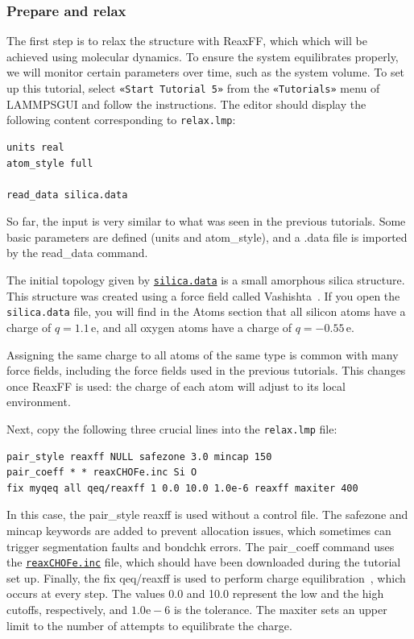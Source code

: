 \documentclass[9pt,tutorial]{livecoms}
\newcommand{\lmpcmd}[1]{\hspace{0pt}\colorbox{listing}{\textcolor{command}{\small{#1}}}\hspace{0pt}} %
\newcommand{\flecmd}[1]{\textcolor{command}{\texttt{#1}}} %
\newcommand{\guicmd}[1]{\textcolor{command}{\texttt{«#1»}}} %
\newcommand{\dwlcmd}[1]{\textcolor{download}{\texttt{#1}}} %
\newcommand{\lammpsgui}{\textsf{LAMMPS\textendash GUI}}
\newcommand{\filepath}{https://raw.githubusercontent.com/lammpstutorials/lammpstutorials-article/main/files/}
\begin{document}
\subsubsection{Prepare and relax}

The first step is to relax the structure with ReaxFF, which which will be achieved using
molecular dynamics.  To ensure the system equilibrates properly, we will monitor certain
parameters over time, such as the system volume.  To set up this
tutorial, select \guicmd{Start Tutorial 5} from the
\guicmd{Tutorials} menu of \lammpsgui{} and follow the instructions.
The editor should display the following content corresponding to \flecmd{relax.lmp}:
\begin{lstlisting}
units real
atom_style full

read_data silica.data

\end{lstlisting}
So far, the input is very similar to what was seen in the previous tutorials.
Some basic parameters are defined (\lmpcmd{units} and \lmpcmd{atom\_style}),
and a \lmpcmd{.data} file is imported by the \lmpcmd{read\_data} command.

The initial topology given by \href{\filepath tutorial5/silica.data}{\dwlcmd{silica.data}}
is a small amorphous silica structure.  This structure was created using a force field called
Vashishta~\cite{vashishta1990interaction}.  If you open the \flecmd{silica.data}
file, you will find in the \lmpcmd{Atoms} section that all silicon atoms have a
charge of $q = 1.1\,\text{e}$, and all oxygen atoms have a charge of $q = -0.55\,\text{e}$.

\begin{note}
Assigning the same charge to all atoms of the same type is common with many
force fields, including the force fields used in the previous tutorials.  This
changes once ReaxFF is used: the charge of each atom will adjust to its local
environment.
\end{note}

Next, copy the following three crucial lines into the \flecmd{relax.lmp} file:
\begin{lstlisting}
pair_style reaxff NULL safezone 3.0 mincap 150
pair_coeff * * reaxCHOFe.inc Si O
fix myqeq all qeq/reaxff 1 0.0 10.0 1.0e-6 reaxff maxiter 400
\end{lstlisting}
In this case, the \lmpcmd{pair\_style reaxff} is used without a control file.  The
\lmpcmd{safezone} and \lmpcmd{mincap} keywords are added to prevent
allocation issues, which sometimes can trigger segmentation faults and
\lmpcmd{bondchk} errors.  The \lmpcmd{pair\_coeff} command uses the
\href{\filepath tutorial5/reaxCHOFe.inc}{\dwlcmd{reaxCHOFe.inc}}
file, which should have been downloaded during the tutorial set up.  Finally, the
\lmpcmd{fix qeq/reaxff} is used to perform charge equilibration~\cite{rappe1991charge},
which occurs at every step.  The values 0.0 and 10.0 represent the
low and the high cutoffs, respectively, and $1.0 \text{e} -6$ is the tolerance.
The \lmpcmd{maxiter} sets an upper limit to the number of attempts to
equilibrate the charge.
\end{document}
